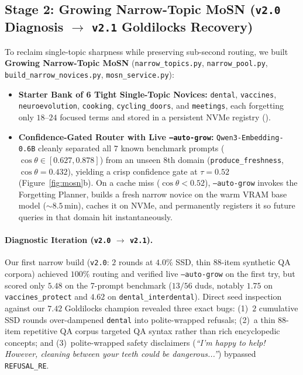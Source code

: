 \documentclass[10.5pt,letterpaper]{article}
\begin{document}
\subsection{Stage 2: Growing Narrow-Topic MoSN (\texttt{v2.0} Diagnosis $\to$ \texttt{v2.1} Goldilocks Recovery)}

To reclaim single-topic sharpness while preserving sub-second routing, we built \textbf{Growing Narrow-Topic MoSN} (\texttt{narrow\_topics.py}, \texttt{narrow\_pool.py}, \texttt{build\_narrow\_novices.py}, \texttt{mosn\_service.py}):
\begin{itemize}
  \item \textbf{Starter Bank of 6 Tight Single-Topic Novices:} \texttt{dental}, \texttt{vaccines}, \texttt{neuroevolution}, \texttt{cooking}, \texttt{cycling\_doors}, and \texttt{meetings}, each forgetting only $18\text{--}24$ focused terms and stored in a persistent NVMe registry ().
  \item \textbf{Confidence-Gated Router with Live \texttt{--auto-grow}:} \texttt{Qwen3-Embedding-0.6B} cleanly separated all $7$ known benchmark prompts ($\cos\theta \in [0.627, 0.878]$) from an unseen 8th domain (\texttt{produce\_freshness}, $\cos\theta\!=\!0.432$), yielding a crisp confidence gate at $\tau\!=\!0.52$ (Figure~\ref{fig:mosn}b). On a cache miss ($\cos\theta < 0.52$), \texttt{--auto-grow} invokes the Forgetting Planner, builds a fresh narrow novice on the warm VRAM base model ($\sim\!8.5\,\text{min}$), caches it on NVMe, and permanently registers it so future queries in that domain hit instantaneously.
\end{itemize}

\paragraph{Diagnostic Iteration (\texttt{v2.0} $\to$ \texttt{v2.1}).} Our first narrow build (\texttt{v2.0}: $2$ rounds at $4.0\%$ SSD, thin $88$-item synthetic QA corpora) achieved $100\%$ routing and verified live \texttt{--auto-grow} on the first try, but scored only $5.48$ on the 7-prompt benchmark ($13/56$ duds, notably $1.75$ on \texttt{vaccines\_protect} and $4.62$ on \texttt{dental\_interdental}). Direct seed inspection against our $7.42$ Goldilocks champion revealed three exact bugs: (1)~$2$ cumulative SSD rounds over-dampened \texttt{dental} into polite-wrapped refusals; (2)~a thin $88$-item repetitive QA corpus targeted QA syntax rather than rich encyclopedic concepts; and (3)~polite-wrapped safety disclaimers (\emph{``I'm happy to help! However, cleaning between your teeth could be dangerous...''}) bypassed \texttt{REFUSAL\_RE}.
\end{document}
